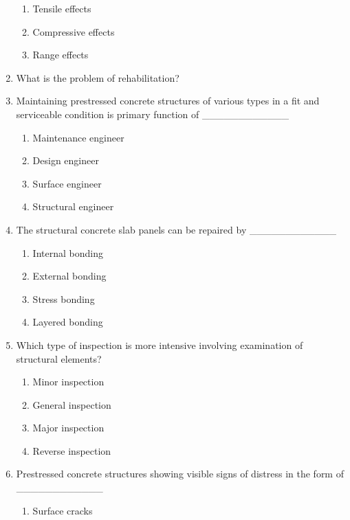 \documentclass[11pt,a4paper]{article}
\begin{document}
\begin{enumerate}
\begin{enumerate}[label=\Alph*.]
\item{Tensile effects}
\item{Compressive effects}
\item{Range effects}
\end{enumerate}
\item{What is the problem of rehabilitation?}
\\
\item{Maintaining prestressed concrete structures of various types in a fit and serviceable condition is primary function of \_\_\_\_\_\_\_\_\_\_\_\_}
\begin{enumerate}[label=\Alph*.]
\item{Maintenance engineer}
\item{Design engineer}
\item{Surface engineer}
\item{Structural engineer}
\end{enumerate}
\item{The structural concrete slab panels can be repaired by \_\_\_\_\_\_\_\_\_\_\_\_}
\begin{enumerate}[label=\Alph*.]
\item{Internal bonding}
\item{External bonding}
\item{Stress bonding}
\item{Layered bonding}
\end{enumerate}
\item{Which type of inspection is more intensive involving examination of structural elements?}
\begin{enumerate}[label=\Alph*.]
\item{Minor inspection}
\item{General inspection}
\item{Major inspection}
\item{Reverse inspection}
\end{enumerate}
\item{Prestressed concrete structures showing visible signs of distress in the form of \_\_\_\_\_\_\_\_\_\_\_\_}
\begin{enumerate}[label=\Alph*.]
\item{Surface cracks}

\end{enumerate}
\end{enumerate}
\end{document}
